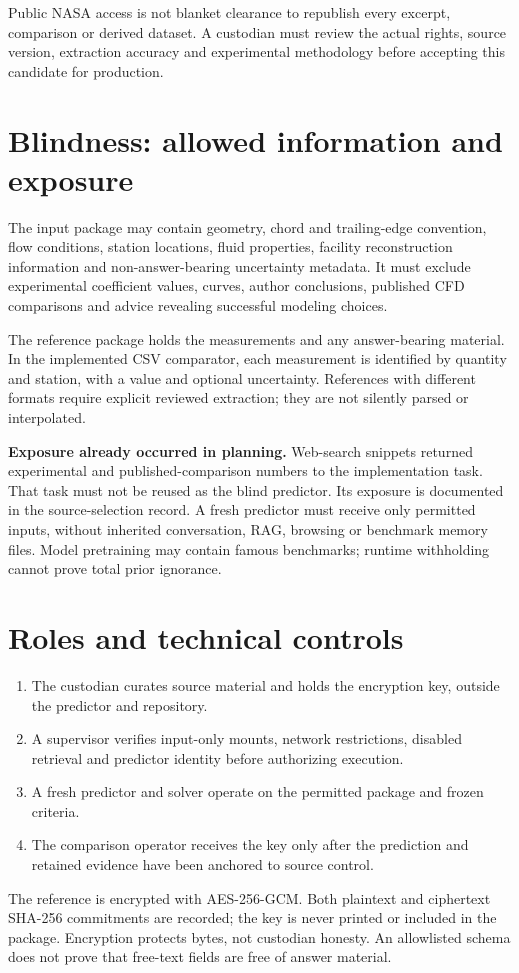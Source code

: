 \documentclass[10pt]{article}
\begin{document}
Public NASA access is not blanket clearance to republish every excerpt, comparison or derived dataset. A custodian must review the actual rights, source version, extraction accuracy and experimental methodology before accepting this candidate for production.
\clearpage
\section{Blindness: allowed information and exposure}
The input package may contain geometry, chord and trailing-edge convention, flow conditions, station locations, fluid properties, facility reconstruction information and non-answer-bearing uncertainty metadata. It must exclude experimental coefficient values, curves, author conclusions, published CFD comparisons and advice revealing successful modeling choices.

The reference package holds the measurements and any answer-bearing material. In the implemented CSV comparator, each measurement is identified by quantity and station, with a value and optional uncertainty. References with different formats require explicit reviewed extraction; they are not silently parsed or interpolated.

\textbf{Exposure already occurred in planning.} Web-search snippets returned experimental and published-comparison numbers to the implementation task. That task must not be reused as the blind predictor. Its exposure is documented in the source-selection record. A fresh predictor must receive only permitted inputs, without inherited conversation, RAG, browsing or benchmark memory files. Model pretraining may contain famous benchmarks; runtime withholding cannot prove total prior ignorance.
\section{Roles and technical controls}
\begin{enumerate}
\item The custodian curates source material and holds the encryption key, outside the predictor and repository.
\item A supervisor verifies input-only mounts, network restrictions, disabled retrieval and predictor identity before authorizing execution.
\item A fresh predictor and solver operate on the permitted package and frozen criteria.
\item The comparison operator receives the key only after the prediction and retained evidence have been anchored to source control.
\end{enumerate}
The reference is encrypted with AES-256-GCM. Both plaintext and ciphertext SHA-256 commitments are recorded; the key is never printed or included in the package. Encryption protects bytes, not custodian honesty. An allowlisted schema does not prove that free-text fields are free of answer material.
\end{document}
